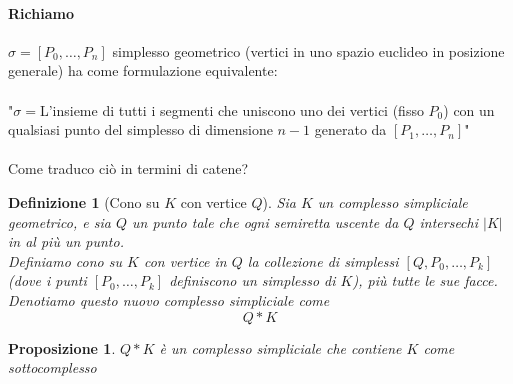 \documentclass[a4paper]{report}
\newtheorem{proposition}{Proposizione}
\newtheorem{definition}{Definizione}
\begin{document}
\paragraph{Richiamo} $\sigma=[P_0,\dots,P_n]$ simplesso geometrico (vertici in uno spazio euclideo in posizione generale) ha come formulazione equivalente:\\\\
"$\sigma=$L'insieme di tutti i segmenti che uniscono uno dei vertici (fisso $P_0$) con un qualsiasi punto del simplesso di dimensione $n-1$ generato da $[P_1,\dots,P_n]$"\\\\
Come traduco ciò in termini di catene?
\begin{definition}[Cono su $K$ con vertice $Q$]
    Sia $K$ un complesso simpliciale geometrico, e sia $Q$ un punto tale che ogni semiretta uscente da $Q$ intersechi $|K|$ in al più un punto.\\
    Definiamo cono su $K$ con vertice in $Q$ la collezione di simplessi $[Q,P_0,\dots,P_k]$ (dove i punti $[P_0,\dots,P_k]$ definiscono un simplesso di $K$), più tutte le sue facce.\\
    Denotiamo questo nuovo complesso simpliciale come
    \[
        Q*K
    \]
\end{definition}
\begin{proposition}
    $Q*K$ è un complesso simpliciale che contiene $K$ come sottocomplesso
\end{proposition}
\end{document}
